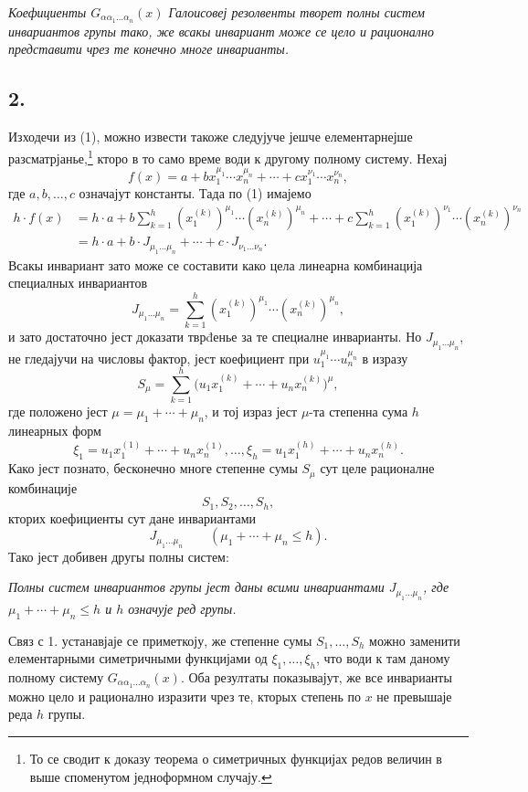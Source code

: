 ﻿\documentclass[11pt]{article}
\begin{document}
{\itshape Коефициенты $G_{\alpha\alpha_1\ldots\alpha_n}(x)$ Галоисовеј резолвенты творет полны систем инвариантов групы тако, же всакы инвариант може се цело и рационално представити чрез те конечно многе инварианты.}

\subsection*{2.}
Изходечи из (1), можно извести такоже следујуче јешче елементарнејше разсматрјанье,\footnote{То се сводит к доказу теорема о симетричных функцијах редов величин в выше споменутом једноформном случају.} кторо в то само време води к другому полному систему. Нехај
\[
  f(x)=a+b x_1^{\mu_1}\cdots x_n^{\mu_n}
       +\cdots+c x_1^{\nu_1}\cdots x_n^{\nu_n},
\]
где $a,b,\ldots,c$ означајут константы. Тада по (1) имајемо
\[
\begin{aligned}
 h\cdot f(x)
 &=h\cdot a+b\sum_{k=1}^{h}(x_1^{(k)})^{\mu_1}\cdots(x_n^{(k)})^{\mu_n}
     +\cdots
     +c\sum_{k=1}^{h}(x_1^{(k)})^{\nu_1}\cdots(x_n^{(k)})^{\nu_n} \\
 &=h\cdot a+b\cdot J_{\mu_1\ldots\mu_n}+\cdots+c\cdot J_{\nu_1\ldots\nu_n}.
\end{aligned}
\]
Всакы инвариант зато може се составити како цела линеарна комбинација специалных инвариантов
\[
  J_{\mu_1\ldots\mu_n}
  =\sum_{k=1}^{h}(x_1^{(k)})^{\mu_1}\cdots(x_n^{(k)})^{\mu_n},
\]
и зато достаточно јест доказати тврđенье за те специалне инварианты. Но $J_{\mu_1\ldots\mu_n}$, не гледајучи на числовы фактор, јест коефициент при $u_1^{\mu_1}\cdots u_n^{\mu_n}$ в изразу
\[
  S_\mu=\sum_{k=1}^{h}
  \bigl(u_1x_1^{(k)}+\cdots+u_nx_n^{(k)}\bigr)^{\mu},
\]
где положено јест $\mu=\mu_1+\cdots+\mu_n$, и тој израз јест $\mu$-та степенна сума $h$ линеарных форм
\[
  \xi_1=u_1x_1^{(1)}+\cdots+u_nx_n^{(1)},\ldots,
  \xi_h=u_1x_1^{(h)}+\cdots+u_nx_n^{(h)}.
\]
Како јест познато, бесконечно многе степенне сумы $S_\mu$ сут целе рационалне комбинације
\[
  S_1,S_2,\ldots,S_h,
\]
кторих коефициенты сут дане инвариантами
\[
  J_{\mu_1\ldots\mu_n}\qquad(\mu_1+\cdots+\mu_n\le h).
\]
Тако јест добивен другы полны систем:

{\itshape Полны систем инвариантов групы јест даны всими инвариантами $J_{\mu_1\ldots\mu_n}$, где $\mu_1+\cdots+\mu_n\le h$ и $h$ означује ред групы.}

Связ с 1. устанавјаје се приметкоју, же степенне сумы $S_1,\ldots,S_h$ можно заменити елементарными симетричными функцијами од $\xi_1,\ldots,\xi_h$, что води к там даному полному систему $G_{\alpha\alpha_1\ldots\alpha_n}(x)$. Оба резултаты показывајут, же все инварианты можно цело и рационално изразити чрез те, кторых степень по $x$ не превышаје реда $h$ групы.
\end{document}
